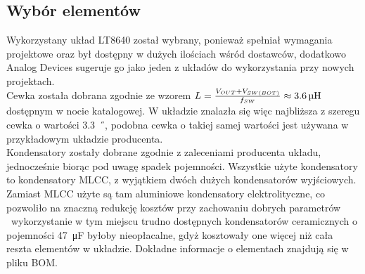 \documentclass{article}
\begin{document}
\subsection{Wybór elementów}
Wykorzystany układ LT8640 został wybrany, ponieważ spełniał wymagania projektowe oraz był dostępny w dużych ilościach wśród dostawców, dodatkowo Analog Devices sugeruje go jako jeden z układów do wykorzystania przy nowych projektach.\\
Cewka została dobrana zgodnie ze wzorem $L = \frac{V_{OUT} + V_{SW(BOT)}}{f_{SW}} \approx \SI{3.6}{\micro\H}$ dostępnym w nocie katalogowej. W układzie znalazła się więc najbliższa z szeregu cewka o wartości \SI{3.3}{\micro\H}, podobna cewka o takiej samej wartości jest używana w przykładowym układzie producenta.\\
Kondensatory zostały dobrane zgodnie z zaleceniami producenta układu, jednocześnie biorąc pod uwagę spadek pojemności. Wszystkie użyte kondensatory to kondensatory MLCC, z wyjątkiem dwóch dużych kondensatorów wyjściowych. Zamiast MLCC użyte są tam aluminiowe kondensatory elektrolityczne, co pozwoliło na znaczną redukcję kosztów przy zachowaniu dobrych parametrów \textemdash \ wykorzystanie w tym miejscu trudno dostępnych kondensatorów ceramicznych o pojemności \SI{47}{\micro\F} byłoby nieopłacalne, gdyż kosztowały one więcej niż cała reszta elementów w układzie. Dokładne informacje o elementach znajdują się w pliku BOM.
\end{document}
